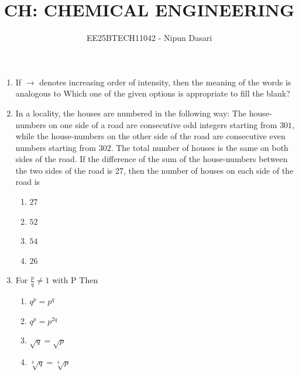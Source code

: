 \documentclass[journal,12pt,onecolumn]{IEEEtran}
\title{CH: CHEMICAL ENGINEERING}
\author{EE25BTECH11042 - Nipun Dasari}
\date{   }
\theoremstyle{remark}
\begin{document}
	
	
	\vspace{3cm}
	
	\maketitle
	\begin{enumerate}
		\item If $\to$ denotes increasing order of intensity, then the meaning of the words
		 is analogous to 
		Which one of the given options is appropriate to fill the blank?
		
		\hfill{}
		\begin{enumerate}
		\end{enumerate}
		
		\item In a locality, the houses are numbered in the following way: The house-numbers on one side of a road are consecutive odd integers starting from $301$, while the house-numbers on the other side of the road are consecutive even numbers starting from $302$. The total number of houses is the same on both sides of the road.
		If the difference of the sum of the house-numbers between the two sides of the road is $27$, then the number of houses on each side of the road is
		
		\hfill{\brak{\text{GATE CH 2024}}}
		\begin{enumerate}
			\item $27$
			\item $52$
			\item $54$
			\item $26$
		\end{enumerate}
		
		\item For $\frac{p}{q} \ne 1$ with P\underline{\hspace{2cm}}
		Then
		\begin{enumerate}
			\item $q^p = p^q$
			\item $q^p = p^{2q}$
			\item $\sqrt{q}=\sqrt{p}$
			\item $\sqrt[p]{q}=\sqrt[q]{p}$
		\end{enumerate}
		

\end{enumerate}
\end{document}
